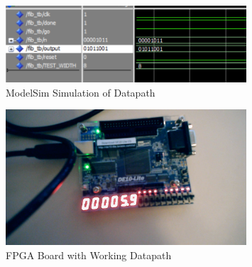 \documentclass{article}
\begin{document}
\begin{figure}[H]
  \centering
  \includegraphics[width=0.8\textwidth]{P1_sim/fib_tb_sim.png}
  \caption{ModelSim Simulation of Datapath}
  \label{fig:model-sim}
\end{figure}

\begin{figure}[H]
  \centering
  \includegraphics[width=0.8\textwidth]{Fib11_Demo.jpg}
  \caption{FPGA Board with Working Datapath}
  \label{fig:fpga-demo}
\end{figure}
\end{document}
